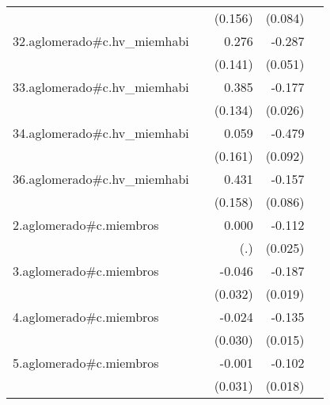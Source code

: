 {\begin{longtable}{l*{4}{D{.}{.}{-1}}}
            &                     &     (0.156)         &     (0.084)         &                     \\
\addlinespace
32.aglomerado#c.hv\_miemhabi&                     &       0.276         &      -0.287\sym{***}&                     \\
            &                     &     (0.141)         &     (0.051)         &                     \\
\addlinespace
33.aglomerado#c.hv\_miemhabi&                     &       0.385\sym{**} &      -0.177\sym{***}&                     \\
            &                     &     (0.134)         &     (0.026)         &                     \\
\addlinespace
34.aglomerado#c.hv\_miemhabi&                     &       0.059         &      -0.479\sym{***}&                     \\
            &                     &     (0.161)         &     (0.092)         &                     \\
\addlinespace
36.aglomerado#c.hv\_miemhabi&                     &       0.431\sym{**} &      -0.157         &                     \\
            &                     &     (0.158)         &     (0.086)         &                     \\
\addlinespace
2.aglomerado#c.miembros&                     &       0.000         &      -0.112\sym{***}&                     \\
            &                     &         (.)         &     (0.025)         &                     \\
\addlinespace
3.aglomerado#c.miembros&                     &      -0.046         &      -0.187\sym{***}&                     \\
            &                     &     (0.032)         &     (0.019)         &                     \\
\addlinespace
4.aglomerado#c.miembros&                     &      -0.024         &      -0.135\sym{***}&                     \\
            &                     &     (0.030)         &     (0.015)         &                     \\
\addlinespace
5.aglomerado#c.miembros&                     &      -0.001         &      -0.102\sym{***}&                     \\
            &                     &     (0.031)         &     (0.018)         &                     \\

\end{longtable}}
